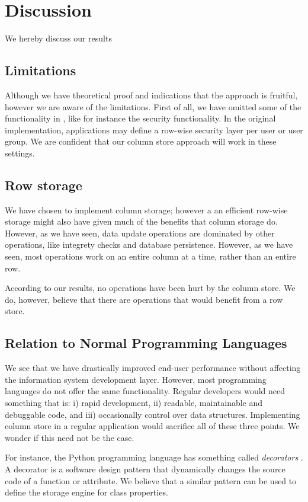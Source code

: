 \chapter{Discussion}
\label{chap:Discussion}
We hereby discuss our results

\section{Limitations}
\label{sec:Limitations}
Although we have theoretical proof and indications that the approach is fruitful, however we are aware of the limitations. First of all, we have omitted some of the functionality in \gap, like for instance the security functionality. In the original implementation, applications may define a row-wise security layer per user or user group. We are confident that our column store approach will work in these settings.

\section{Row storage}
\label{sec:Row storage}
We have chosen to implement column storage; however a an efficient row-wise storage might also have given much of the benefits that column storage do. However, as we have seen, data update operations are dominated by other operations, like integrety checks and database persistence. However, as we have seen, most operations work on an entire column at a time, rather than an entire row. 

According to our results, no operations have been hurt by the column store. We do, however, believe that there are operations that would benefit from a row store.

\section{Relation to Normal Programming Languages}
\label{sec:Relation to Normal Programming Languages}
We see that we have drastically improved end-user performance without affecting the information system development layer. However, most programming languages do not offer the same functionality. Regular developers would need something that is: i) rapid development, ii) readable, maintainable and debuggable code, and iii) occasionally control over data structures. Implementing column store in a regular application would sacrifice all of these three points. We wonder if this need not be the case.

For instance, the Python programming language has something called \textit{decorators} \cite{noauthor_undated-aq}. A decorator is a software design pattern that dynamically changes the source code of a function or attribute. We believe that a similar pattern can be used to define the storage engine for class properties.


